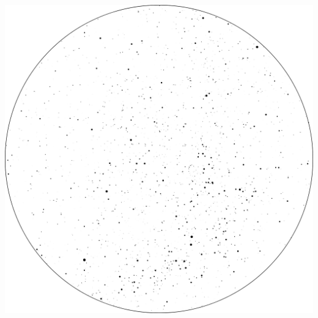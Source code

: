 \documentclass{SAS-class-skygen}
\begin{document}
	\vspace{0.5cm}
    \begin{center}
    \includegraphics[width=\textwidth]{./pics/sky_chart17.png}
    \end{center}
    
    
\end{document}
